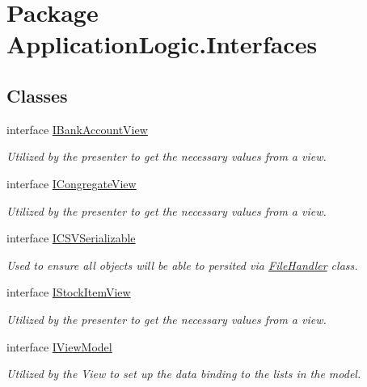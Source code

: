 \hypertarget{namespace_application_logic_1_1_interfaces}{
\section{Package ApplicationLogic.Interfaces}
\label{namespace_application_logic_1_1_interfaces}
}
\subsection*{Classes}
\begin{DoxyCompactItemize}
\item 
interface \hyperlink{interface_application_logic_1_1_interfaces_1_1_i_bank_account_view}{IBankAccountView}
\begin{DoxyCompactList}\small\item\em Utilized by the presenter to get the necessary values from a view. \item\end{DoxyCompactList}\item 
interface \hyperlink{interface_application_logic_1_1_interfaces_1_1_i_congregate_view}{ICongregateView}
\begin{DoxyCompactList}\small\item\em Utilized by the presenter to get the necessary values from a view. \item\end{DoxyCompactList}\item 
interface \hyperlink{interface_application_logic_1_1_interfaces_1_1_i_c_s_v_serializable-g}{ICSVSerializable}
\begin{DoxyCompactList}\small\item\em Used to ensure all objects will be able to persited via \hyperlink{class_application_logic_1_1_file_handler-g}{FileHandler} class. \item\end{DoxyCompactList}\item 
interface \hyperlink{interface_application_logic_1_1_interfaces_1_1_i_stock_item_view}{IStockItemView}
\begin{DoxyCompactList}\small\item\em Utilized by the presenter to get the necessary values from a view. \item\end{DoxyCompactList}\item 
interface \hyperlink{interface_application_logic_1_1_interfaces_1_1_i_view_model}{IViewModel}
\begin{DoxyCompactList}\small\item\em Utilized by the View to set up the data binding to the lists in the model. \item\end{DoxyCompactList}\end{DoxyCompactItemize}
